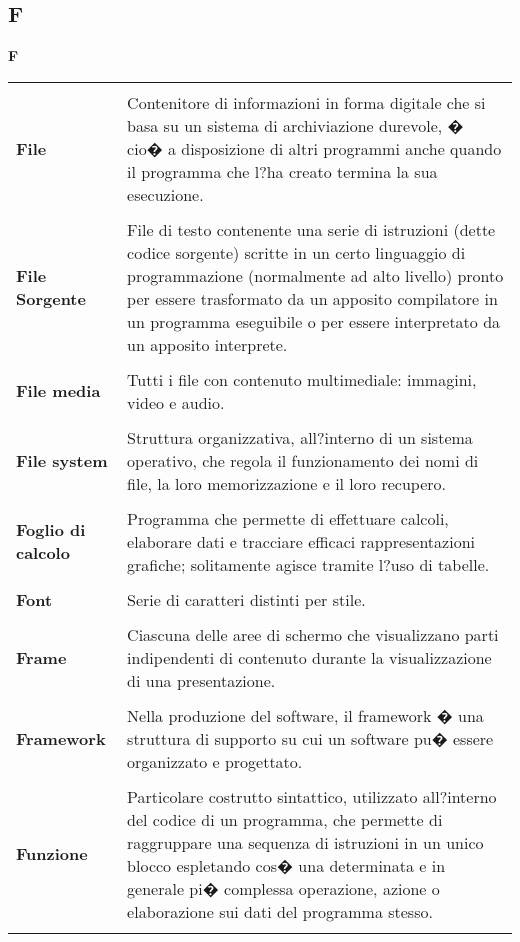 {\subsection{F} 
\hfill\Huge{\textbf{F}} \\ 
\normalsize 
\begin{longtabu} to 
\toprule \\ 
\textbf{File} & Contenitore di informazioni in forma digitale che si basa su un sistema di archiviazione durevole, � cio� a disposizione di altri programmi anche quando il programma che l?ha creato termina la sua esecuzione. \\ 
 \\ 
\textbf{File Sorgente} & File di testo contenente una serie di istruzioni (dette codice sorgente) scritte in un certo linguaggio di programmazione (normalmente ad alto livello) pronto per essere trasformato da un apposito compilatore in un programma eseguibile o per essere interpretato da un apposito interprete. \\ 
 \\ 
\textbf{File media} & Tutti i file con contenuto multimediale: immagini, video e audio. \\ 
 \\ 
\textbf{File system} & Struttura organizzativa, all?interno di un sistema operativo, che regola il funzionamento dei nomi di file, la loro memorizzazione e il loro recupero. \\ 
 \\ 
\textbf{Foglio di calcolo} & Programma che permette di effettuare calcoli, elaborare dati e tracciare efficaci rappresentazioni grafiche; solitamente agisce tramite l?uso di tabelle. \\ 
 \\ 
\textbf{Font} & Serie di caratteri distinti per stile. \\ 
 \\ 
\textbf{Frame} & Ciascuna delle aree di schermo che visualizzano parti indipendenti di contenuto durante la visualizzazione di una presentazione. \\ 
 \\ 
\textbf{Framework} & Nella produzione del software, il framework � una struttura di supporto su cui un software pu� essere organizzato e progettato. \\ 
 \\ 
\textbf{Funzione} & Particolare costrutto sintattico, utilizzato all?interno del codice di un programma, che permette di raggruppare una sequenza di istruzioni in un unico blocco espletando cos� una determinata e in generale pi� complessa operazione, azione o elaborazione sui dati del programma stesso. \\ 
 \\ 
\end{longtabu} 
\newpage 
}
